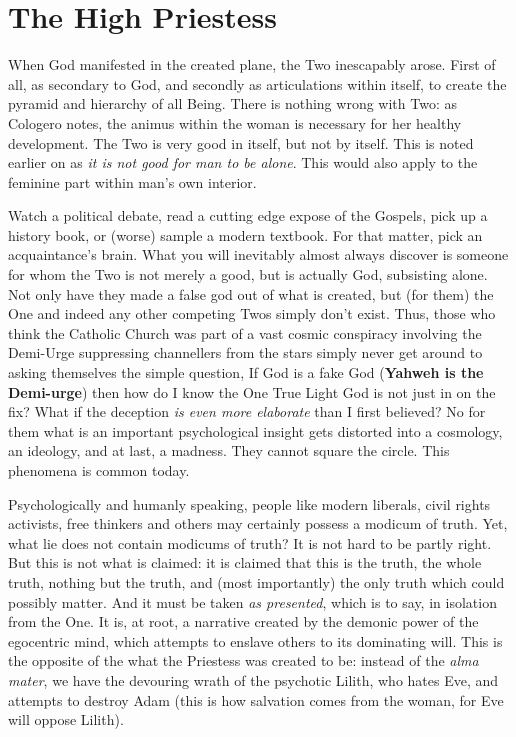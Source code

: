 \section{The High Priestess}


When God manifested in the created plane, the Two inescapably arose. First of all, as secondary to God, and secondly as articulations within itself, to create the pyramid and hierarchy of all Being. There is nothing wrong with Two: as Cologero notes, the animus within the woman is necessary for her healthy development. The Two is very good in itself, but not by itself. This is noted earlier on as \emph{it is not good for man to be alone}. This would also apply to the feminine part within man's own interior.

Watch a political debate, read a cutting edge expose of the Gospels, pick up a history book, or (worse) sample a modern textbook. For that matter, pick an acquaintance's brain. What you will inevitably almost always discover is someone for whom the Two is not merely a good, but is actually God, subsisting alone. Not only have they made a false god out of what is created, but (for them) the One and indeed any other competing Twos simply don't exist. Thus, those who think the Catholic Church was part of a vast cosmic conspiracy involving the Demi-Urge suppressing channellers from the stars simply never get around to asking themselves the simple question, If God is a fake God (\textbf{Yahweh is the Demi-urge}) then how do I know the One True Light God is not just in on the fix? What if the deception \emph{is even more elaborate} than I first believed? No for them what is an important psychological insight gets distorted into a cosmology, an ideology, and at last, a madness. They cannot square the circle. This phenomena is common today.

Psychologically and humanly speaking, people like modern liberals, civil rights activists, free thinkers and others may certainly possess a modicum of truth. Yet, what lie does not contain modicums of truth? It is not hard to be partly right. But this is not what is claimed: it is claimed that this is the truth, the whole truth, nothing but the truth, and (most importantly) the only truth which could possibly matter. And it must be taken \emph{as presented}, which is to say, in isolation from the One. It is, at root, a narrative created by the demonic power of the egocentric mind, which attempts to enslave others to its dominating will. This is the opposite of the what the Priestess was created to be: instead of the \emph{alma mater}, we have the devouring wrath of the psychotic Lilith, who hates Eve, and attempts to destroy Adam (this is how salvation comes from the woman, for Eve will oppose Lilith).

